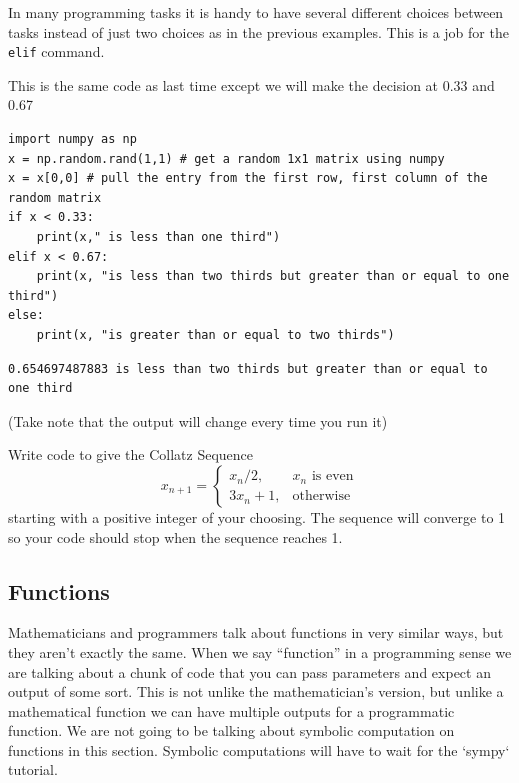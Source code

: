 In many programming tasks it is handy to have several different choices between tasks
instead of just two choices as in the previous examples.  This is a job for the
\texttt{elif} command.

\begin{example}
This is the same code as last time except we will make the decision at 0.33 and 0.67    
\bcode
\begin{lstlisting}
import numpy as np
x = np.random.rand(1,1) # get a random 1x1 matrix using numpy
x = x[0,0] # pull the entry from the first row, first column of the random matrix
if x < 0.33:
    print(x," is less than one third")
elif x < 0.67:
    print(x, "is less than two thirds but greater than or equal to one third")
else:
    print(x, "is greater than or equal to two thirds")
\end{lstlisting}
\boutput
\begin{lstlisting}
0.654697487883 is less than two thirds but greater than or equal to one third
\end{lstlisting}
(Take note that the output will change every time you run it)
\end{example}

\begin{problem}
    Write code to give the Collatz Sequence
$$x_{n+1} = \left\{ \begin{array}{ll} x_n / 2, & \text{$x_n$ is even} \\ 3 x_n + 1, & \text{otherwise} \end{array} \right.$$
starting with a positive integer of your choosing.  The sequence will converge to 1 so your code should stop when the sequence reaches 1.

\end{problem}





\subsection{Functions}
Mathematicians and programmers talk about functions in very similar ways, but they aren't
exactly the same.  When we say ``function'' in a programming sense we are talking about a
chunk of code that you can pass parameters and expect an output of some sort.  This is not
unlike the mathematician's version, but unlike a mathematical function we can have
multiple outputs for a programmatic function.  We are not going to be talking about
symbolic computation on functions in this section.  Symbolic computations will have to
wait for the `sympy` tutorial.



